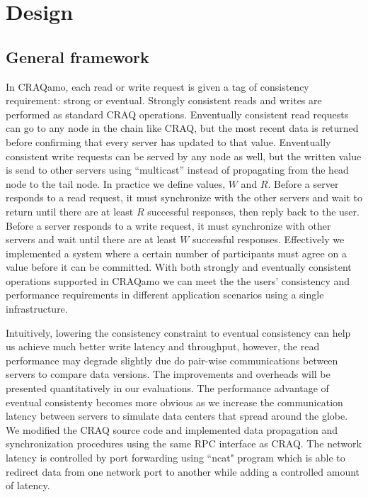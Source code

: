 \section{Design}
\label{sec:design}

\subsection{General framework}
In CRAQamo, each read or write request is given a tag of consistency requirement: strong or eventual. Strongly consistent reads and writes are performed as standard CRAQ operations. Enventually consistent read requests can go to any node in the chain like CRAQ, but the most recent data is returned before confirming that every server has updated to that value. Enventually consistent write requests can be served by any node as well, but the written value is send to other servers using ``multicast'' instead of propagating from the head node to the tail node. In practice we define values, $W$ and $R$. Before a server responds to a read request, it must synchronize with the other servers and wait to return until there are at least $R$ successful responses, then reply back to the user.  Before a server responds to a write request, it must synchronize with other servers and wait until there are at least $W$ successful responses. Effectively we implemented a system where a certain number of participants must agree on a value before it can be committed. With both strongly and eventually consistent operations supported in CRAQamo we can meet the the users' consistency and performance requirements in different application scenarios using a single infrastructure. 

Intuitively, lowering the consistency constraint to eventual consistency can help us achieve much better write latency and throughput, however, the read performance may degrade slightly due do pair-wise communications between servers to compare data versions. The improvements and overheads will be presented quantitatively in our evaluations. The performance advantage of eventual consistenty becomes more obvious as we increase the communication latency between servers to simulate data centers that spread around the globe. We modified the CRAQ source code and implemented data propagation and synchronization procedures using the same RPC interface as CRAQ. The network latency is controlled by port forwarding using ``ncat" program which is able to redirect data from one network port to another while adding a controlled amount of latency.

